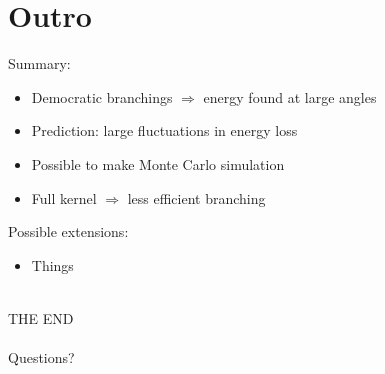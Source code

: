 \documentclass[pstricks,mathserif]{beamer}
\begin{document}
\section{Outro}
\begin{frame}


Summary:

\begin{itemize}
\item Democratic branchings $\Rightarrow$ energy found at large angles
\item Prediction: large fluctuations in energy loss
\item Possible to make Monte Carlo simulation
\item Full kernel $\Rightarrow$ less efficient branching
\end{itemize}

Possible extensions:

\begin{itemize}
\item Things
\end{itemize}
~\\
\center THE END\\
~\\
Questions?

\end{frame}
\end{document}
